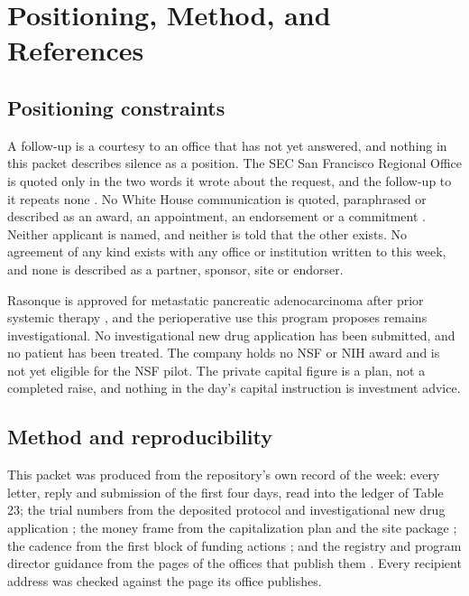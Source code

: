 \section{Positioning, Method, and References}

\subsection{Positioning constraints}

A follow-up is a courtesy to an office that has not yet answered, and nothing in
this packet describes silence as a position. The SEC San Francisco Regional
Office is quoted only in the two words it wrote about the request, and the
follow-up to it repeats none \cite{secsf2026}. No White House communication is
quoted, paraphrased or described as an award, an appointment, an endorsement or a
commitment \cite{whcontact2026}. Neither applicant is named, and neither is told
that the other exists. No agreement of any kind exists with any office or
institution written to this week, and none is described as a partner, sponsor,
site or endorser.

Rasonque is approved for metastatic pancreatic adenocarcinoma after prior
systemic therapy \cite{fdarasonque2026}, and the perioperative use this program
proposes remains investigational. No investigational new drug application has
been submitted, and no patient has been treated. The company holds no NSF or NIH
award and is not yet eligible for the NSF pilot. The private capital figure is a
plan, not a completed raise, and nothing in the day's capital instruction is
investment advice.

\subsection{Method and reproducibility}

This packet was produced from the repository's own record of the week: every
letter, reply and submission of the first four days, read into the ledger of
Table 23; the trial numbers from the deposited protocol
and investigational new drug application \cite{onpremwhippl,phase1ind}; the
money frame from the capitalization plan and the site package
\cite{capitalplan2026,movein2026}; the cadence from the first block of funding
actions \cite{autofund2026}; and the registry and program director guidance from
the pages of the offices that publish them \cite{sbacompanyreg2026,ncisbirpd2026}.
Every recipient address was checked against the page its office publishes.

